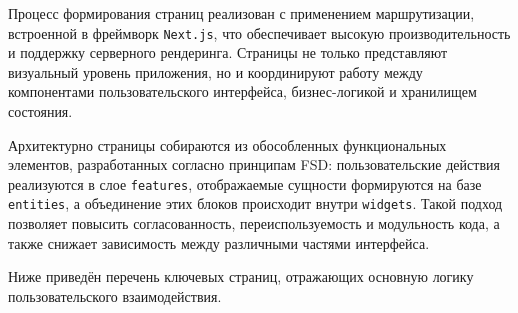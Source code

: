 Процесс формирования страниц реализован с применением маршрутизации, встроенной в фреймворк \texttt{Next.js}, что обеспечивает высокую производительность и поддержку серверного рендеринга. Страницы не только представляют визуальный уровень приложения, но и координируют работу между компонентами пользовательского интерфейса, бизнес-логикой и хранилищем состояния. 

Архитектурно страницы собираются из обособленных функциональных элементов, разработанных согласно принципам FSD: пользовательские действия реализуются в слое \texttt{features}, отображаемые сущности формируются на базе \texttt{entities}, а объединение этих блоков происходит внутри \texttt{widgets}. Такой подход позволяет повысить согласованность, переиспользуемость и модульность кода, а также снижает зависимость между различными частями интерфейса.

Ниже приведён перечень ключевых страниц, отражающих основную логику пользовательского взаимодействия.

